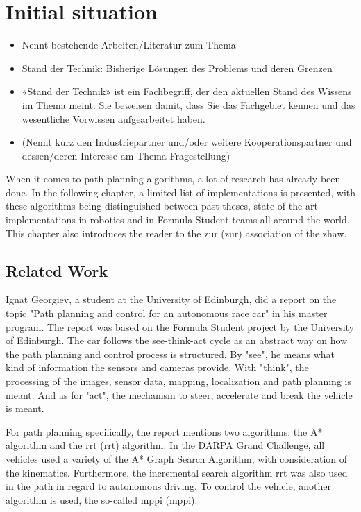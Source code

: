 \section{Initial situation}

\begin{itemize}
    \item Nennt bestehende Arbeiten/Literatur zum Thema
    \item Stand der Technik: Bisherige Lösungen des Problems und deren Grenzen
    \item «Stand der Technik» ist ein Fachbegriff, der den aktuellen Stand des Wissens im Thema meint. Sie beweisen damit, dass Sie das Fachgebiet kennen und das wesentliche Vorwissen aufgearbeitet haben.
    \item (Nennt kurz den Industriepartner und/oder weitere Kooperationspartner und dessen/deren Interesse am Thema Fragestellung)
\end{itemize}

When it comes to path planning algorithms, a lot of research has already been done. In the following chapter, a limited list of implementations is presented, with these algorithms being distinguished between past theses, state-of-the-art implementations in robotics and in Formula Student teams all around the world. This chapter also introduces the reader to the \acrlong{zur} (\acrshort{zur}) association of the \acrlong{zhaw}.

\subsection{Related Work}

Ignat Georgiev, a student at the University of Edinburgh, did a report on the topic "Path planning and control for an autonomous race car" in his master program. The report was based on the Formula Student project by the University of Edinburgh. The car follows the see-think-act cycle as an abstract way on how the path planning and control process is structured. By "see", he means what kind of information the sensors and cameras provide. With "think", the processing of the images, sensor data, mapping, localization and path planning is meant. And as for "act", the mechanism to steer, accelerate and break the vehicle is meant.

For path planning specifically, the report mentions two algorithms: the A* algorithm and the \acrlong{rrt} (\acrshort{rrt}) algorithm. In the DARPA Grand Challenge, all vehicles used a variety of the A* Graph Search Algorithm, with consideration of the kinematics. Furthermore, the incremental search algorithm \acrshort{rrt} was also used in the path in regard to autonomous driving.
To control the vehicle, another algorithm is used, the so-called \acrlong{mppi} (\acrshort{mppi}).
\cite{path_planning_and_control_georgiev}

